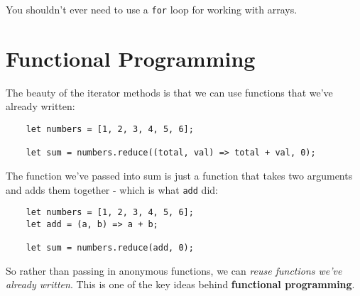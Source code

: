 You shouldn't ever need to use a \texttt{for} loop for working with arrays.


\pagebreak

\section{Functional Programming}

The beauty of the iterator methods is that we can use functions that we've already written:

\begin{verbatim}
    let numbers = [1, 2, 3, 4, 5, 6];

    let sum = numbers.reduce((total, val) => total + val, 0);
\end{verbatim}

The function we've passed into sum is just a function that takes two arguments and adds them together - which is what \texttt{add} did:

\begin{verbatim}
    let numbers = [1, 2, 3, 4, 5, 6];
    let add = (a, b) => a + b;

    let sum = numbers.reduce(add, 0);
\end{verbatim}

So rather than passing in anonymous functions, we can \textit{reuse functions we've already written}. This is one of the key ideas behind \textbf{functional programming}.


\pagebreak


